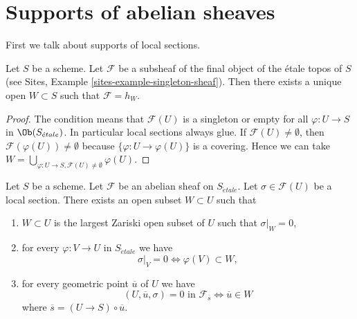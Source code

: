 \section{Supports of abelian sheaves}
\label{section-support}

\noindent
First we talk about supports of local sections.

\begin{lemma}
\label{lemma-support-subsheaf-final}
Let $S$ be a scheme. Let $\mathcal{F}$ be a subsheaf of the final
object of the \'etale topos of $S$ (see
Sites, Example \ref{sites-example-singleton-sheaf}).
Then there exists a unique open
$W \subset S$ such that $\mathcal{F} = h_W$.
\end{lemma}

\begin{proof}
The condition means that $\mathcal{F}(U)$ is a singleton or
empty for all $\varphi : U \to S$ in $\Ob(S_{\acute{e}tale})$.
In particular local sections always glue. If
$\mathcal{F}(U) \not = \emptyset$, then
$\mathcal{F}(\varphi(U)) \not = \emptyset$ because
$\{\varphi : U \to \varphi(U)\}$ is a covering.
Hence we can take
$W = \bigcup_{\varphi : U \to S, \mathcal{F}(U) \not = \emptyset} \varphi(U)$.
\end{proof}

\begin{lemma}
\label{lemma-zero-over-image}
Let $S$ be a scheme.
Let $\mathcal{F}$ be an abelian sheaf on $S_{\acute{e}tale}$.
Let $\sigma \in \mathcal{F}(U)$ be a local section.
There exists an open subset $W \subset U$ such that
\begin{enumerate}
\item $W \subset U$ is the largest Zariski open subset of $U$ such
that $\sigma|_W = 0$,
\item for every $\varphi : V \to U$ in $S_{\acute{e}tale}$ we have
$$
\sigma|_V = 0 \Leftrightarrow \varphi(V) \subset W,
$$
\item for every geometric point $\overline{u}$ of $U$ we have
$$
(U, \overline{u}, \sigma) = 0\text{ in }\mathcal{F}_{\overline{s}}
\Leftrightarrow
\overline{u} \in W
$$
where $\overline{s} = (U \to S) \circ \overline{u}$.
\end{enumerate}
\end{lemma}

